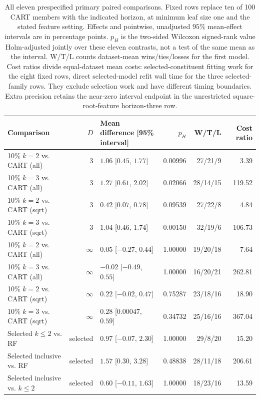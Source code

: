 \begin{table}[t]
\centering\small
\caption{All eleven prespecified primary paired comparisons. Fixed rows
replace ten of 100 CART members with the indicated horizon, at minimum
leaf size one and the stated feature setting. Effects and pointwise,
unadjusted $95\%$ mean-effect intervals are in percentage points.
$p_H$ is the two-sided Wilcoxon signed-rank value Holm-adjusted jointly
over these eleven contrasts, not a test of the same mean as the interval.
W/T/L counts dataset-mean wins/ties/losses for the first model. Cost ratios
divide equal-dataset mean costs: selected-constituent fitting work for
the eight fixed rows, direct selected-model refit wall time for the three
selected-family rows. They exclude selection work and have different
timing boundaries. Extra precision retains the near-zero interval endpoint
in the unrestricted square-root-feature horizon-three row.}
\label{tab:comparisons}
\begin{tabular}{@{}lrlrrr@{}}\toprule
Comparison & $D$ & Mean difference [95\% interval] & $p_H$ & W/T/L & Cost ratio\\
\midrule
10\% $k=2$ vs. CART (all) & 3 & $1.06$ [$0.45$, $1.77$] & 0.00996 & 27/21/9 & 3.39 \\
10\% $k=3$ vs. CART (all) & 3 & $1.27$ [$0.61$, $2.02$] & 0.02066 & 28/14/15 & 119.52 \\
10\% $k=2$ vs. CART (sqrt) & 3 & $0.42$ [$0.07$, $0.78$] & 0.09539 & 27/22/8 & 4.84 \\
10\% $k=3$ vs. CART (sqrt) & 3 & $1.04$ [$0.46$, $1.74$] & 0.00150 & 32/19/6 & 106.73 \\
10\% $k=2$ vs. CART (all) & $\infty$ & $0.05$ [$-0.27$, $0.44$] & 1.00000 & 19/20/18 & 7.64 \\
10\% $k=3$ vs. CART (all) & $\infty$ & $-0.02$ [$-0.49$, $0.55$] & 1.00000 & 16/20/21 & 262.81 \\
10\% $k=2$ vs. CART (sqrt) & $\infty$ & $0.22$ [$-0.02$, $0.47$] & 0.75287 & 23/18/16 & 18.90 \\
10\% $k=3$ vs. CART (sqrt) & $\infty$ & $0.28$ [$0.00047$, $0.59$] & 0.34732 & 25/16/16 & 367.04 \\
\midrule
Selected $k\leq2$ vs. RF & selected & $0.97$ [$-0.07$, $2.30$] & 1.00000 & 29/8/20 & 15.20 \\
Selected inclusive vs. RF & selected & $1.57$ [$0.30$, $3.28$] & 0.48838 & 28/11/18 & 206.61 \\
Selected inclusive vs. $k\leq2$ & selected & $0.60$ [$-0.11$, $1.63$] & 1.00000 & 18/23/16 & 13.59 \\
\bottomrule
\end{tabular}
\end{table}
